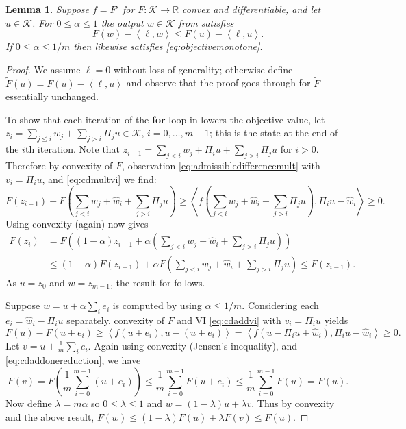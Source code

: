 \documentclass[letterpaper,final,12pt,reqno]{amsart}
\theoremstyle{cstyle}
\newtheorem{lemma}[theorem]{Lemma}
\theoremstyle{cstyle*}
\theoremstyle{dstyle}
\numberwithin{equation}{section}
\numberwithin{figure}{section}
\numberwithin{table}{section}
\numberwithin{theorem}{section}
\newcommand{\RR}{\mathbb{R}}
\newcommand{\cK}{\mathcal{K}}
\newcommand{\ip}[2]{\left<#1,#2\right>}
\begin{document}
\begin{lemma} \cite{Tai2003}  Suppose $f=F'$ for $F:\cK\to\RR$ convex and differentiable, and let $u\in\cK$.  For $0 \le \alpha \le 1$ the output $w \in \cK$ from  satisfies
\begin{equation}
F(w) - \ip{\ell}{w} \le F(u) - \ip{\ell}{u}.  \label{eq:objectivemonotone}
\end{equation}
If $0 \le \alpha \le 1/m$ then  likewise satisfies \eqref{eq:objectivemonotone}.
\end{lemma}

\begin{proof}  We assume $\ell=0$ without loss of generality; otherwise define $\tilde F(u)=F(u) - \ip{\ell}{u}$ and observe that the proof goes through for $\tilde F$ essentially unchanged.

To show that each iteration of the \textbf{for} loop in  lowers the objective value, let $z_{i} = \sum_{j\le i} w_j + \sum_{j > i} \Pi_j u \in \cK$, $i=0,\dots,m-1$; this is the state at the end of the $i$th iteration.  Note that $z_{i-1} = \sum_{j < i} w_j + \Pi_i u + \sum_{j > i} \Pi_j u$ for $i>0$.  Therefore by convexity of $F$, observation \eqref{eq:admissibledifferencemult} with $v_i=\Pi_i u$, and \eqref{eq:cdmultvi} we find:
\begin{equation*}
F(z_{i-1}) - F\left(\sum_{j<i} w_j + \hat w_i + \sum_{j > i} \Pi_j u\right) \ge \ip{f\left(\sum_{j<i} w_j + \hat w_i + \sum_{j > i} \Pi_j u\right)}{\Pi_i u - \hat w_i} \ge 0.
\end{equation*}
Using convexity (again) now gives
\begin{align*}
F(z_i) &= F\left((1-\alpha) z_{i-1} + \alpha \left(\sum_{j<i} w_j + \hat w_i + \sum_{j > i} \Pi_j u\right)\right) \\
&\le  (1-\alpha) F(z_{i-1}) + \alpha F\left(\sum_{j<i} w_j + \hat w_i + \sum_{j > i} \Pi_j u\right) \le F(z_{i-1}).
\end{align*}
As $u=z_0$ and $w = z_{m-1}$, the result for  follows.

Suppose $w=u+\alpha\sum_i e_i$ is computed by  using $\alpha \le 1/m$.  Considering each $e_i=\hat w_i - \Pi_i u$ separately, convexity of $F$ and VI \eqref{eq:cdaddvi} with $v_i=\Pi_i u$ yields
\begin{equation}
F(u) - F(u+e_i) \ge \ip{f(u+e_i)}{u-(u+e_i)} = \ip{f(u-\Pi_i u + \hat w_i)}{\Pi_i u - \hat w_i} \ge 0. \label{eq:cdaddonereduction}
\end{equation}
Let $v = u+ \frac{1}{m} \sum_i e_i$.  Again using convexity (Jensen's inequality), and \eqref{eq:cdaddonereduction}, we have
\begin{equation*}
F(v) = F\left(\frac{1}{m} \sum_{i=0}^{m-1} (u+e_i)\right) \le \frac{1}{m} \sum_{i=0}^{m-1} F(u+e_i) \le \frac{1}{m} \sum_{i=0}^{m-1} F(u) = F(u).
\end{equation*}
Now define $\lambda = m\alpha$ so $0 \le \lambda \le 1$ and $w = (1-\lambda) u + \lambda v$.  Thus by convexity and the above result, $F(w) \le (1-\lambda) F(u) + \lambda F(v) \le F(u)$.
\end{proof}
\end{document}
